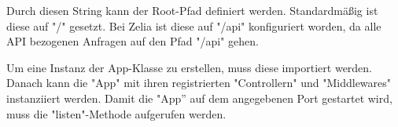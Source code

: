 
Durch diesen String kann der Root-Pfad definiert werden. Standardmäßig ist diese auf "/" gesetzt. Bei Zelia ist diese auf "/api" konfiguriert worden, da alle API bezogenen Anfragen auf den Pfad "/api" gehen.

Um eine Instanz der App-Klasse zu erstellen, muss diese importiert werden. Danach kann die "App" mit ihren registrierten "Controllern" und "Middlewares" instanziiert werden. Damit die "App” auf dem angegebenen Port gestartet wird, muss die "listen"-Methode aufgerufen werden.

